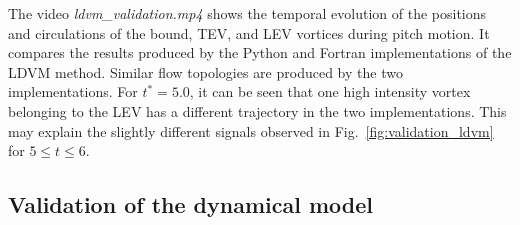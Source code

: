 \documentclass[a4paper,12pt]{article}
\begin{document}
The video \textit{ldvm\_validation.mp4} shows the temporal evolution of the positions and circulations of the bound, TEV, and LEV vortices during pitch motion. It compares the results produced by the Python and Fortran implementations of the LDVM method. Similar flow topologies are produced by the two implementations.
For $t^*=5.0$, it can be seen that one high intensity vortex belonging to the LEV has a different trajectory in the two implementations.
This may explain the slightly different signals observed in Fig.~\ref{fig:validation_ldvm} for $5\leq t\leq6$.









\subsection{Validation of the dynamical model}
\end{document}
